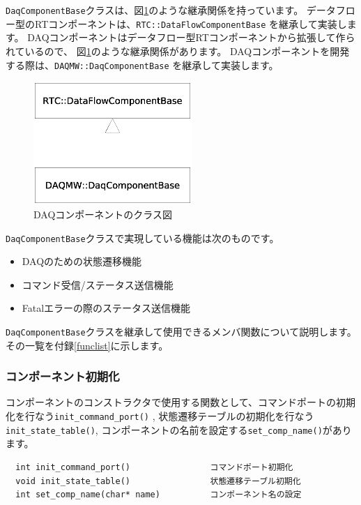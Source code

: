 \documentclass[a4j,10pt,dvips,onecolumn,oneside,final]{jarticle}%
\begin{document}
\verb|DaqComponentBase|クラスは、図\ref{class-diag.fig}のような継承関係を持っています。
データフロー型のRTコンポーネントは、\verb|RTC::DataFlowComponentBase| を継承して実装します。
DAQコンポーネントはデータフロー型RTコンポーネントから拡張して作られているので、
図\ref{class-diag.fig}のような継承関係があります。
DAQコンポーネントを開発する際は、\verb|DAQMW::DaqComponentBase| を継承して実装します。
\begin{figure}[htbp]
 \begin{center}
  \includegraphics[width=60mm]{class-diag.eps}
  \caption{DAQコンポーネントのクラス図}
  \label{class-diag.fig}
 \end{center}
\end{figure}

\verb|DaqComponentBase|クラスで実現している機能は次のものです。
\begin{itemize}
\item DAQのための状態遷移機能
\item コマンド受信/ステータス送信機能
\item Fatalエラーの際のステータス送信機能
\end{itemize}

\verb|DaqComponentBase|クラスを継承して使用できるメンバ関数について説明します。
その一覧を付録\ref{funclist}に示します。


\subsubsection{コンポーネント初期化}\label{init}
コンポーネントのコンストラクタで使用する関数として、コマンドポートの初期化を行なう\verb|init_command_port()|
, 状態遷移テーブルの初期化を行なう\verb|init_state_table()|, コンポーネントの名前を設定する\verb|set_comp_name()|があります。
\begin{Verbatim}
  int init_command_port()                コマンドポート初期化
  void init_state_table()                状態遷移テーブル初期化
  int set_comp_name(char* name)          コンポーネント名の設定
\end{Verbatim}
\end{document}
